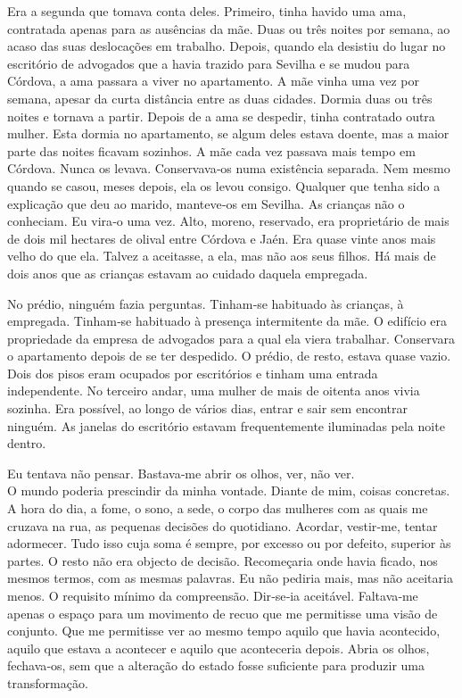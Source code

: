 Era a segunda que tomava conta deles. Primeiro, tinha havido uma ama,
contratada apenas para as ausências da mãe. Duas ou três noites por
semana, ao acaso das suas deslocações em trabalho. Depois, quando ela
desistiu do lugar no escritório de advogados que a havia trazido para
Sevilha e se mudou para Córdova, a ama passara a viver no apartamento. A
mãe vinha uma vez por semana, apesar da curta distância entre as duas
cidades. Dormia duas ou três noites e tornava a partir. Depois de a ama
se despedir, tinha contratado outra mulher. Esta dormia no apartamento,
se algum deles estava doente, mas a maior parte das noites ficavam
sozinhos. A mãe cada vez passava mais tempo em Córdova. Nunca os levava.
Conservava­‑os numa existência separada. Nem mesmo quando se casou,
meses depois, ela os levou consigo. Qualquer que tenha sido a explicação
que deu ao marido, manteve­‑os em Sevilha. As crianças não o conheciam.
Eu vira­‑o uma vez. Alto, moreno, reservado, era proprietário de mais de
dois mil hectares de olival entre Córdova e Jaén. Era quase vinte anos
mais velho do que ela. Talvez a aceitasse, a ela, mas não aos seus
filhos. Há mais de dois anos que as crianças estavam ao cuidado daquela
empregada.

No prédio, ninguém fazia perguntas. Tinham­‑se habituado às crianças, à
empregada. Tinham­‑se habituado à presença intermitente da mãe. O
edifício era propriedade da empresa de advogados para a qual ela viera
trabalhar. Conservara o apartamento depois de se ter despedido. O
prédio, de resto, estava quase vazio. Dois dos pisos eram ocupados por
escritórios e tinham uma entrada independente. No terceiro andar, uma
mulher de mais de oitenta anos vivia sozinha. Era possível, ao longo de
vários dias, entrar e sair sem encontrar ninguém. As janelas do
escritório estavam frequentemente iluminadas pela noite dentro.

Eu tentava não pensar. Bastava­‑me abrir os olhos, ver, não ver.\\
O mundo poderia prescindir da minha vontade. Diante de mim, coisas
concretas. A hora do dia, a fome, o sono, a sede, o corpo das mulheres
com as quais me cruzava na rua, as pequenas decisões do quotidiano.
Acordar, vestir­‑me, tentar adormecer. Tudo isso cuja soma é sempre, por
excesso ou por defeito, superior às partes. O resto não era objecto de
decisão. Recomeçaria onde havia ficado, nos mesmos termos, com as mesmas
palavras. Eu não pediria mais, mas não aceitaria menos. O requisito
mínimo da compreensão. Dir­‑se­‑ia aceitável. Faltava­‑me apenas o
espaço para um movimento de recuo que me permitisse uma visão de
conjunto. Que me permitisse ver ao mesmo tempo aquilo que havia
acontecido, aquilo que estava a acontecer e aquilo que aconteceria
depois. Abria os olhos, fechava­‑os, sem que a alteração do estado fosse
suficiente para produzir uma transformação.

